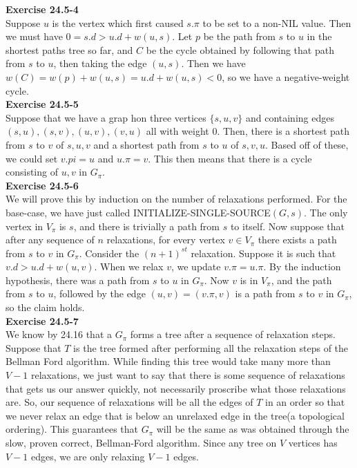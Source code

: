 \documentclass{article}
\begin{document}
\noindent\textbf{Exercise 24.5-4}\\

Suppose $u$ is the vertex which first caused $s.\pi$ to be set to a non-NIL value.  Then we must have $0 = s.d > u.d + w(u,s)$. Let $p$ be the path from $s$ to $u$ in the shortest paths tree so far, and $C$ be the cycle obtained by following that path from $s$ to $u$, then taking the edge $(u,s)$.  Then we have $w(C) = w(p) + w(u,s) = u.d + w(u,s) < 0$, so we have a negative-weight cycle. \\


\noindent\textbf{Exercise 24.5-5}\\

Suppose that we have a grap hon three vertices $\{s,u,v\}$ and containing edges $(s,u),(s,v),(u,v),(v,u)$ all with weight 0. Then, there is a shortest path from $s$ to $v$ of $s,u,v$ and a shortest path from $s$ to $u$ of $s,v,u$. Based off of these, we could set $v.pi= u$ and $u.\pi = v$. This then means that there is a cycle consisting of $u,v$ in $G_\pi$.\\

\noindent\textbf{Exercise 24.5-6}\\

We will prove this by induction on the number of relaxations performed.  For the base-case, we have just called INITIALIZE-SINGLE-SOURCE$(G,s)$.  The only vertex in $V_\pi$ is $s$, and there is trivially a path from $s$ to itself.  Now suppose that after any sequence of $n$ relaxations, for every vertex $v \in V_\pi$ there exists a path from $s$ to $v$ in $G_\pi$.  Consider the $(n+1)^{st}$ relaxation.  Suppose it is such that $v.d > u.d + w(u,v)$.  When we relax $v$, we update $v.\pi = u.\pi$.  By the induction hypothesis, there was a path from $s$ to $u$ in $G_\pi$.  Now $v$ is in $V_\pi$, and the path from $s$ to $u$, followed by the edge $(u,v) = (v.\pi, v)$ is a path from $s$ to $v$ in $G_\pi$, so the claim holds. \\

\noindent\textbf{Exercise 24.5-7}\\

We know by 24.16 that a $G_\pi$ forms a tree after a sequence of relaxation steps. Suppose that $T$ is the tree formed after performing all the relaxation steps of the Bellman Ford algorithm. While finding this tree would take many more than $V-1$ relaxations, we just want to say that there is some sequence of relaxations that gets us our answer quickly, not necessarily proscribe what those relaxations are. So, our sequence of relaxations will be all the edges of $T$ in an order so that we never relax an edge that is below an unrelaxed edge in the tree(a topological ordering). This guarantees that $G_\pi$ will be the same as was obtained through the slow, proven correct, Bellman-Ford algorithm. Since any tree on $V$ vertices has $V-1$ edges, we are only relaxing $V-1$ edges.\\
\end{document}
